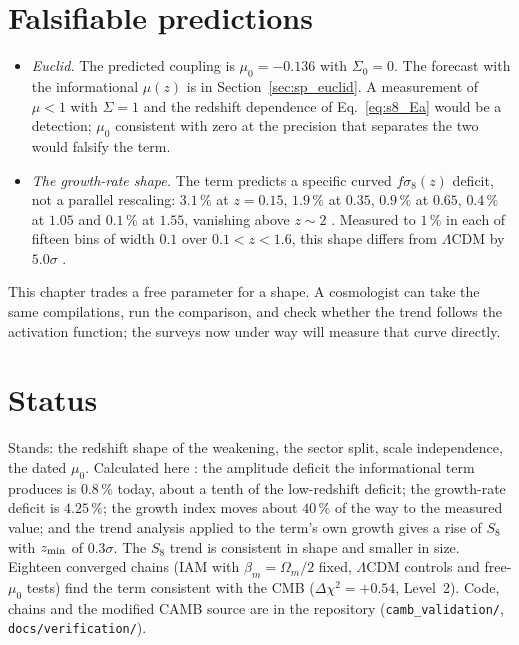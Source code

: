 \section{Falsifiable predictions}
\begin{itemize}
\item \emph{Euclid.} The predicted coupling is $\mu_0=-0.136$ with $\Sigma_0=0$. The forecast with the informational $\mu(z)$ is in
Section~\ref{sec:sp_euclid}. A measurement of $\mu<1$ with $\Sigma=1$ and the redshift
dependence of Eq.~\eqref{eq:s8_Ea} would be a detection; $\mu_0$ consistent with zero at the precision that separates the two would falsify the term.
\prediction
\item \emph{The growth-rate shape.} The term predicts a specific curved $f\sigma_8(z)$ deficit, not a parallel rescaling: $3.1\,\%$ at $z=0.15$, $1.9\,\%$
at $0.35$, $0.9\,\%$ at $0.65$, $0.4\,\%$ at $1.05$ and $0.1\,\%$ at $1.55$, vanishing above $z\sim2$ \calc. Measured to $1\,\%$ in each of fifteen bins
of width $0.1$ over $0.1<z<1.6$, this shape differs from $\Lambda$CDM by $5.0\sigma$ \calc.
\end{itemize}

This chapter trades a free parameter for a shape. A cosmologist can take the same compilations, run the comparison, and check whether the trend follows the activation function; the surveys now under way will measure that curve directly.

\section{Status}
Stands: the redshift shape of the weakening, the sector split, scale independence, the dated $\mu_0$. Calculated here \calc: the amplitude deficit the
informational term produces is $0.8\,\%$ today, about a tenth of the low-redshift deficit; the growth-rate deficit is $4.25\,\%$; the growth index moves
about $40\,\%$ of the way to the measured value; and the trend analysis applied to the term's own growth gives a rise of $S_8$ with $z_{\rm min}$ of $0.3\sigma$.
The $S_8$ trend is consistent in shape and smaller in size. Eighteen converged chains (IAM with $\beta_m=\Omega_m/2$ fixed, $\Lambda$CDM controls and free-$\mu_0$ tests) find the term consistent with the
CMB ($\Delta\chi^2=+0.54$, Level~2). Code, chains and the modified CAMB source are in the repository (\texttt{camb\_validation/}, \texttt{docs/verification/}).
